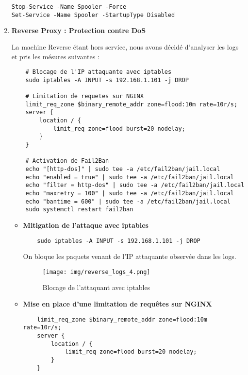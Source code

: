 \documentclass[a4paper,12pt]{report}
\begin{document}
\begin{enumerate}
\begin{lstlisting}
Stop-Service -Name Spooler -Force
Set-Service -Name Spooler -StartupType Disabled
\end{lstlisting}

    

    \item \textbf{Reverse Proxy : Protection contre DoS}

    La machine Reverse étant hors service, nous avons décidé d'analyser les logs et pris les mésures suivantes : 
    \begin{lstlisting}
    # Blocage de l'IP attaquante avec iptables
    sudo iptables -A INPUT -s 192.168.1.101 -j DROP

    # Limitation de requetes sur NGINX
    limit_req_zone $binary_remote_addr zone=flood:10m rate=10r/s;
    server {
        location / {
            limit_req zone=flood burst=20 nodelay;
        }
    }

    # Activation de Fail2Ban
    echo "[http-dos]" | sudo tee -a /etc/fail2ban/jail.local
    echo "enabled = true" | sudo tee -a /etc/fail2ban/jail.local
    echo "filter = http-dos" | sudo tee -a /etc/fail2ban/jail.local
    echo "maxretry = 100" | sudo tee -a /etc/fail2ban/jail.local
    echo "bantime = 600" | sudo tee -a /etc/fail2ban/jail.local
    sudo systemctl restart fail2ban
    \end{lstlisting}

    \begin{itemize}
        \item \textbf{Mitigation de l'attaque avec iptables}
    \begin{lstlisting}
    sudo iptables -A INPUT -s 192.168.1.101 -j DROP
    \end{lstlisting}
    On bloque les paquets venant de l'IP attaquante observée dans les logs.
    \begin{figure}[H]
        \centering
        \texttt{[image: img/reverse\_logs\_4.png]}
        \caption{Blocage de l'attaquant avec iptables}
        \label{Blocage-attaquant-iptables}
    \end{figure}

    \item \textbf{Mise en place d'une limitation de requêtes sur NGINX}
    \begin{lstlisting}
    limit_req_zone $binary_remote_addr zone=flood:10m rate=10r/s;
    server {
        location / {
            limit_req zone=flood burst=20 nodelay;
        }
    }
    \end{lstlisting}
    

\end{itemize}
\end{enumerate}
\end{document}
